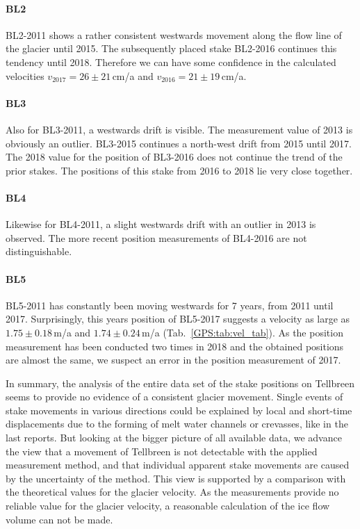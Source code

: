 \paragraph{BL2}
BL2-2011 shows a rather consistent westwards movement along the flow line of the glacier until 2015.
The subsequently placed stake BL2-2016 continues this tendency until 2018.
Therefore we can have some confidence in the calculated velocities
\mbox{$v_{2017} = 26 \pm 21\,$cm/a} and \mbox{$v_{2016} = 21 \pm 19\,$cm/a}.

\paragraph{BL3}
Also for BL3-2011, a westwards drift is visible.
The measurement value of 2013 is obviously an outlier.
BL3-2015 continues a north-west drift from 2015 until 2017.
The 2018 value for the position of BL3-2016 does not continue the trend of the prior stakes.
The positions of this stake from 2016 to 2018 lie very close together.

\paragraph{BL4}
Likewise for BL4-2011, a slight westwards drift with an outlier in 2013 is observed.
The more recent position measurements of BL4-2016 are not distinguishable.

\paragraph{BL5}
BL5-2011 has constantly been moving westwards for 7 years, from 2011 until 2017.
Surprisingly, this years position of BL5-2017 suggests a velocity as large as
$1.75 \pm 0.18\,$m/a and $1.74 \pm 0.24\,$m/a (Tab.~\ref{GPS:tab:vel_tab}).
As the position measurement has been conducted two times in 2018 and the obtained positions are almost the same,
we suspect an error in the position measurement of 2017.
\bigskip

In summary, the analysis of the entire data set of the stake positions on Tellbreen seems to provide
no evidence of a consistent glacier movement.
Single events of stake movements in various directions
could be explained by local and short-time displacements due to the forming
of melt water channels or crevasses, like in the last reports.
But looking at the bigger picture of all available data,
we advance the view that a movement of Tellbreen is not detectable with the applied measurement method,
and that individual apparent stake movements are caused by the uncertainty of the method.
This view is supported by a comparison with the theoretical values for the glacier velocity.
As the measurements provide no reliable value for the glacier velocity,
a reasonable calculation of the ice flow volume can not be made.


